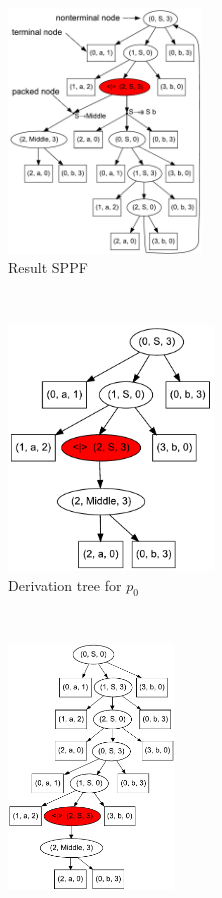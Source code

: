 \begin{figure}[ht]
    \begin{center}
    \centering
    \begin{subfigure}[b]{0.33\textwidth}
         \includegraphics[height=6.5cm]{dot/AnBn.pdf}
        \caption{Result SPPF}
        \label{SPPF}        
    \end{subfigure}
    ~
    \begin{subfigure}[b]{0.33\textwidth}
        \includegraphics[height=6.5cm]{dot/AnBn_2.pdf}
        \caption{Derivation tree for $p_0$}
        \label{tree1}        
    \end{subfigure}
    ~
    \begin{subfigure}[b]{0.33\textwidth}
        \includegraphics[height=6.5cm]{dot/AnBn_1.pdf}

\end{subfigure}
\end{center}
\end{figure}
